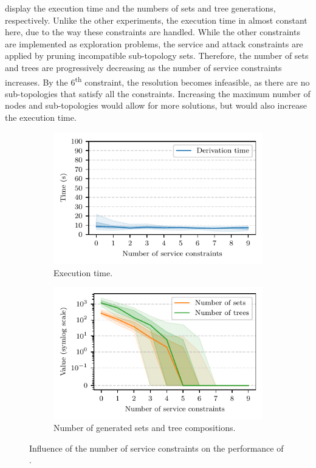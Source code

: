  display the execution time and the numbers of sets and tree generations, respectively.
Unlike the other experiments, the execution time in almost constant here, due to the way these constraints are handled.
While the other constraints are implemented as exploration problems, the service and attack constraints are applied by pruning incompatible sub-topology sets.
Therefore, the number of sets and trees are progressively decreasing as the number of service constraints increases.
By the 6\textsuperscript{th} constraint, the resolution becomes infeasible, as there are no sub-topologies that satisfy all the constraints.
Increasing the maximum number of nodes and sub-topologies would allow for more solutions, but would also increase the execution time.


\begin{figure}
  \centering
  \begin{subfigure}[t]{0.49\linewidth}
    \includegraphics[width=\linewidth]{figures/services_time.pdf}
    \caption{
      Execution time.
      \label{fig:topologies.benchmark.services-time}
    }
  \end{subfigure}
  \hfill
  \begin{subfigure}[t]{0.49\linewidth}
    \includegraphics[width=\linewidth]{figures/services_numbers.pdf}
    \caption{
      Number of generated sets and tree compositions.
      \label{fig:topologies.benchmark.services-numbers}
    }
  \end{subfigure}
  \caption{
    Influence of the number of service constraints on the performance of \thecontrib.
    \label{fig:topologies.benchmark.services}
  }
\end{figure}